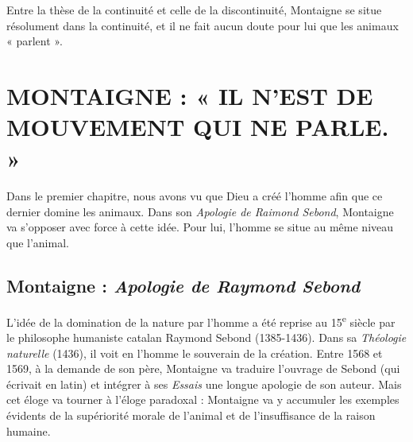 Entre la thèse de la continuité et celle de la discontinuité, Montaigne se situe résolument dans la continuité, et il ne fait aucun doute pour lui que les animaux « parlent ».
\section{MONTAIGNE : « IL N’EST DE MOUVEMENT QUI NE PARLE. »}
Dans le premier chapitre, nous avons vu que Dieu a créé l’homme afin que ce dernier domine les animaux. Dans son \textit{Apologie de Raimond Sebond}, Montaigne va s’opposer avec force à cette idée. Pour lui, l’homme se situe au même niveau que l’animal.
\subsection{Montaigne : \textit{Apologie de Raymond Sebond}}
L’idée de la domination de la nature par l’homme a été reprise au 15\textsuperscript{e} siècle par le philosophe humaniste catalan Raymond Sebond (1385-1436). Dans sa \textit{Théologie naturelle} (1436), il voit en l’homme le souverain de la création. Entre 1568 et 1569, à la demande de son père, Montaigne va traduire l’ouvrage de Sebond (qui écrivait en latin) et intégrer à ses \textit{Essais} une longue apologie de son auteur. Mais cet éloge va tourner à l’éloge paradoxal : Montaigne va y accumuler les exemples évidents de la supériorité morale de l’animal et de l’insuffisance de la raison humaine.
